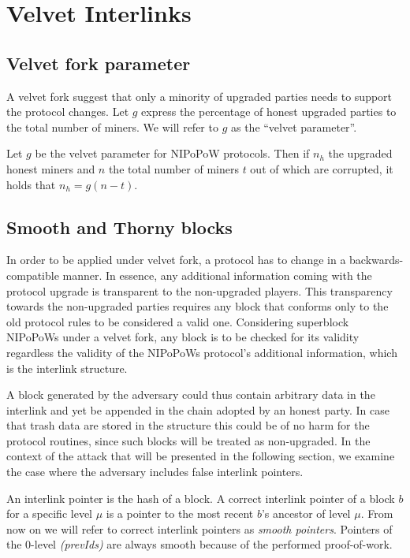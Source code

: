 \section{Velvet Interlinks}
\subsection{Velvet fork parameter}
A velvet fork suggest that only a minority of upgraded parties needs to support the protocol changes. Let $g$ express the percentage of honest upgraded parties to the total number of miners. We will refer to $g$ as the ``velvet parameter''.

\begin{definition}
	Let $g$ be the velvet parameter for NIPoPoW protocols. Then if $n_h$ the upgraded honest miners and $n$ the total number of miners $t$ out of which are corrupted, it holds that $n_h = g (n - t)$.
	\label{defn:velvet_honest_majority}
\end{definition}

\subsection{Smooth and Thorny blocks}
In order to be applied under velvet fork, a protocol has to change in a backwards-compatible manner. In essence, any additional information coming with the protocol upgrade is transparent to the non-upgraded players. This transparency towards the non-upgraded parties requires any block that conforms only to the old protocol rules to be considered a valid one. Considering superblock NIPoPoWs under a velvet fork, any block is to be checked for its validity regardless the validity of the NIPoPoWs protocol's additional information, which is the interlink structure.

A block generated by the adversary could thus contain arbitrary data in the interlink and yet be appended in the chain adopted by an honest party. In case that trash data are stored in the structure this could be of no harm for the protocol routines, since such blocks will be treated as non-upgraded. In the context of the attack that will be presented in the following section, we examine the case where the adversary includes false interlink pointers.

An interlink pointer is the hash of a block. A correct interlink pointer of a block $b$ for a specific level $\mu$ is a pointer to the most recent $b$'s ancestor of level $\mu$. From now on we will refer to correct interlink pointers as \emph{smooth pointers}. Pointers of the 0-level \textit{(prevIds)} are always smooth because of the performed proof-of-work.

